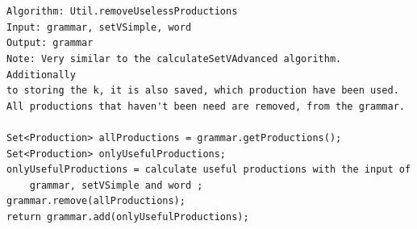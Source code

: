 \\
\\

\pagebreak

\lstset{language=java}
\begin{lstlisting}[frame=htrbl, caption={Util.removeUselessProductions}, 
label={lst:Util.removeUselessProductions}]
Algorithm: Util.removeUselessProductions
Input: grammar, setVSimple, word
Output: grammar
Note: Very similar to the calculateSetVAdvanced algorithm. Additionally
to storing the k, it is also saved, which production have been used. 
All productions that haven't been need are removed, from the grammar.

Set<Production> allProductions = grammar.getProductions();
Set<Production> onlyUsefulProductions;
onlyUsefulProductions = calculate useful productions with the input of
	grammar, setVSimple and word ;
grammar.remove(allProductions);
return grammar.add(onlyUsefulProductions);
\end{lstlisting}

\pagebreak